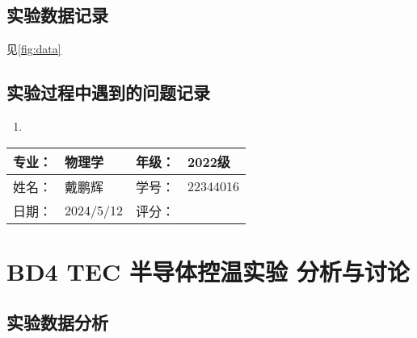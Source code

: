 \documentclass[dvipsnames, svgnames,a4paper,11pt]{article}
\begin{document}
\subsection{实验数据记录}

	见\cref{fig:data}









\subsection{实验过程中遇到的问题记录}

\begin{enumerate}
	\item 
\end{enumerate}
	

\clearpage
\begin{table}
	\renewcommand\arraystretch{1.7}
	\begin{tabularx}{\textwidth}{|X|X|X|X|}
	\hline
	专业：& 物理学 &年级：& 2022级\\
	\hline
	姓名： & 戴鹏辉 & 学号：& 22344016\\
	\hline
    日期：& 2024/5/12 & 评分： &\\
	\hline
	\end{tabularx}
\end{table}

\section{BD4 \quad TEC 半导体控温实验 \quad\heiti 分析与讨论}

\subsection{实验数据分析}
\end{document}

